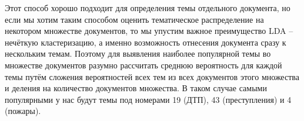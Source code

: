 Этот способ хорошо подходит для определения темы отдельного документа, но если мы хотим таким способом оценить тематическое распределение на некотором множестве документов, то мы упустим важное преимущество LDA -- нечёткую кластеризацию, а именно возможность отнесения документа сразу к нескольким темам. Поэтому для выявления наиболее популярной темы во множестве документов разумно рассчитать среднюю вероятность для каждой темы путём сложения вероятностей всех тем из всех документов этого множества и деления на количество документов множества. В таком случае самыми популярными у нас будут темы под номерами 19 (ДТП), 43 (преступления) и 4 (пожары).

